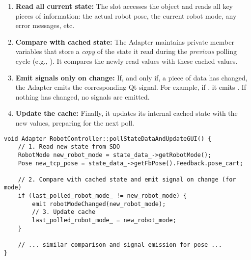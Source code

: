 \begin{enumerate}
    \item \textbf{Read all current state:} The slot accesses the  object and reads all key pieces of information: the actual robot pose, the current robot mode, any error messages, etc.
    \item \textbf{Compare with cached state:} The Adapter maintains private member variables that store a \textit{copy} of the state it read during the \textit{previous} polling cycle (e.g., ). It compares the newly read values with these cached values.
    \item \textbf{Emit signals only on change:} If, and only if, a piece of data has changed, the Adapter emits the corresponding Qt signal. For example, if , it emits . If nothing has changed, no signals are emitted.
    \item \textbf{Update the cache:} Finally, it updates its internal cached state with the new values, preparing for the next poll.
\end{enumerate}

\begin{verbatim}
void Adapter_RobotController::pollStateDataAndUpdateGUI() {
    // 1. Read new state from SDO
    RobotMode new_robot_mode = state_data_->getRobotMode();
    Pose new_tcp_pose = state_data_->getFbPose().Feedback.pose_cart;

    // 2. Compare with cached state and emit signal on change (for mode)
    if (last_polled_robot_mode_ != new_robot_mode) {
        emit robotModeChanged(new_robot_mode);
        // 3. Update cache
        last_polled_robot_mode_ = new_robot_mode;
    }
    
    // ... similar comparison and signal emission for pose ...
}
\end{verbatim}
\label{lst:adapter-poll-slot}


